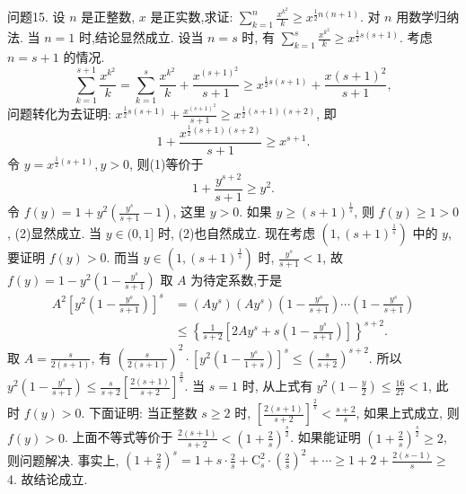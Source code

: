 问题15. 设 $n$ 是正整数, $x$ 是正实数,求证: $\sum_{k=1}^n \frac{x^{k^2}}{k} \geqslant x^{\frac{1}{2} n(n+1)}$.
对 $n$ 用数学归纳法.
当 $n=1$ 时,结论显然成立.
设当 $n=s$ 时, 有 $\sum_{k=1}^s \frac{x^{k^2}}{k} \geqslant x^{\frac{1}{2} s(s+1)}$. 考虑 $n=s+1$ 的情况.
$$
\sum_{k=1}^{s+1} \frac{x^{k^2}}{k}=\sum_{k=1}^s \frac{x^{k^2}}{k}+\frac{x^{(s+1)^2}}{s+1} \geqslant x^{\frac{1}{2} s(s+1)}+\frac{x(s+1)^2}{s+1},
$$
问题转化为去证明: $x^{\frac{1}{2} s(s+1)}+\frac{x^{(s+1)^2}}{s+1} \geqslant x^{\frac{1}{2}(s+1)(s+2)}$, 即
$$
1+\frac{x^{\frac{1}{2}(s+1)(s+2)}}{s+1} \geqslant x^{s+1} . \label{(1)}
$$
令 $y=x^{\frac{1}{2}(s+1)}, y>0$, 则(1)等价于
$$
1+\frac{y^{s+2}}{s+1} \geqslant y^2 . \label{(2)}
$$
令 $f(y)=1+y^2\left(\frac{y^s}{s+1}-1\right)$, 这里 $y>0$.
如果 $y \geqslant(s+1)^{\frac{1}{s}}$, 则 $f(y) \geqslant 1>0$, (2)显然成立.
当 $y \in(0,1]$ 时, (2)也自然成立.
现在考虑 $\left(1,(s+1)^{\frac{1}{s}}\right)$ 中的 $y$, 要证明 $f(y)>0$.
而当 $y \in\left(1,(s+1)^{\frac{1}{s}}\right)$ 时, $\frac{y^s}{s+1}<1$, 故 $f(y)=1-y^2\left(1-\frac{y^s}{s+1}\right)$
取 $A$ 为待定系数,于是
$$
\begin{aligned}
A^2\left[y^2\left(1-\frac{y^s}{s+1}\right)\right]^s & =\left(A y^s\right)\left(A y^s\right)\left(1-\frac{y^s}{s+1}\right) \cdots\left(1-\frac{y^s}{s+1}\right) \\
& \leqslant\left\{\frac{1}{s+2}\left[2 A y^s+s\left(1-\frac{y^s}{s+1}\right)\right]\right\}^{s+2} .
\end{aligned}
$$
取 $A=\frac{s}{2(s+1)}$, 有 $\left(\frac{s}{2(s+1)}\right)^2 \cdot\left[y^2\left(1-\frac{y^s}{1+s}\right)\right]^s \leqslant\left(\frac{s}{s+2}\right)^{s+2}$.
所以 $y^2\left(1-\frac{y^s}{s+1}\right) \leqslant \frac{s}{s+2}\left[\frac{2(s+1)}{s+2}\right]^{\frac{2}{s}}$.
当 $s=1$ 时, 从上式有 $y^2\left(1-\frac{y}{2}\right) \leqslant \frac{16}{27}<1$, 此时 $f(y)>0$.
下面证明: 当正整数 $s \geqslant 2$ 时, $\left[\frac{2(s+1)}{s+2}\right]^{\frac{2}{s}}<\frac{s+2}{s}$, 如果上式成立, 则 $f(y)>0$.
上面不等式等价于 $\frac{2(s+1)}{s+2}<\left(1+\frac{2}{s}\right)^{\frac{s}{2}}$. 如果能证明 $\left(1+\frac{2}{s}\right)^{\frac{s}{2}} \geqslant 2$, 则问题解决.
事实上, $\left(1+\frac{2}{s}\right)^s=1+s \cdot \frac{2}{s}+\mathrm{C}_s^2 \cdot\left(\frac{2}{s}\right)^2+\cdots \geqslant 1+2+\frac{2(s-1)}{s} \geqslant$ 4. 故结论成立.



